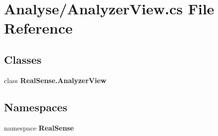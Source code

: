 \section{Analyse/\+Analyzer\+View.cs File Reference}
\label{_analyzer_view_8cs}
\subsection*{Classes}
\begin{DoxyCompactItemize}
\item 
class \textbf{ Real\+Sense.\+Analyzer\+View}
\end{DoxyCompactItemize}
\subsection*{Namespaces}
\begin{DoxyCompactItemize}
\item 
namespace \textbf{ Real\+Sense}
\end{DoxyCompactItemize}
